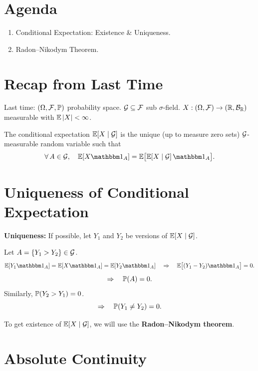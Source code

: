 
\section*{Agenda}
\begin{enumerate}[label=(\roman*)]
    \item Conditional Expectation: Existence \& Uniqueness.
    \item Radon--Nikodym Theorem.
\end{enumerate}

\section{Recap from Last Time}

Last time: $(\Omega, \mathcal{F}, \mathbb{P})$ probability space. $\mathcal{G} \subseteq \mathcal{F}$ sub $\sigma$-field. $X : (\Omega, \mathcal{F}) \to (\mathbb{R}, \mathcal{B}_{\mathbb{R}})$ measurable with $\mathbb{E}\left|X\right| < \infty$.

The conditional expectation $\mathbb{E}[X \mid \mathcal{G}]$ is the unique (up to measure zero sets) $\mathcal{G}$-measurable random variable such that
\[
    \forall\, A \in \G, \quad \E[X \ind_A] = \E\bigl[\E[X \mid \G]\, \ind_A\bigr].
\]

\section{Uniqueness of Conditional Expectation}

\textbf{Uniqueness:} If possible, let $Y_1$ and $Y_2$ be versions of $\mathbb{E}[X \mid \mathcal{G}]$.

Let $A = \{Y_1 > Y_2\} \in \mathcal{G}$.
\[
    \E[Y_1 \ind_A] = \E[X \ind_A] = \E[Y_2 \ind_A]
    \quad \Rightarrow \quad
    \E\bigl[(Y_1 - Y_2)\ind_A\bigr] = 0.
\]
\[
    \Rightarrow \quad \mathbb{P}(A) = 0.
\]
Similarly, $\mathbb{P}(Y_2 > Y_1) = 0$.
\[
    \Rightarrow \quad \mathbb{P}(Y_1 \neq Y_2) = 0.
\]

To get existence of $\mathbb{E}[X \mid \mathcal{G}]$, we will use the \textbf{Radon--Nikodym theorem}.

\section{Absolute Continuity}

